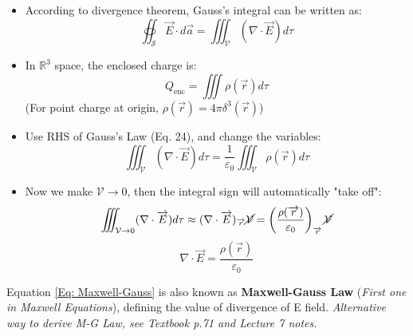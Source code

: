 \documentclass[12pt,a4paper,twoside]{article}
\begin{document}
    \begin{itemize}
        \item According to divergence theorem, Gauss's integral can be written as:
        \[\oiint_\mathcal{S}\overrightarrow{E}\cdot d\overrightarrow{a}=\iiint_{\mathcal{V}}(\nabla\cdot \overrightarrow{E})d\tau\]
        
        \item In $\mathbb{R}^3$ space, the enclosed charge is:
        \[Q_{\mathrm{enc}}=\iiint \rho(\overrightarrow{r})d\tau\]
        (For point charge at origin, $\rho(\overrightarrow{r})=4\pi\delta^3(\overrightarrow{r})$)
        
        \item Use RHS of Gauss's Law (Eq. 24), and change the variables:
        \[\iiint_{\mathcal{V}}(\nabla\cdot \overrightarrow{E})d\tau=\frac{1}{\varepsilon_0}\iiint_{\mathcal{V}}\rho(\overrightarrow{r})d\tau\]
        
        \item Now we make $\mathcal{V}\to 0$, then the integral sign will automatically "take off":
        \[\iiint_{\mathcal{V}\to 0}(\nabla\cdot \overrightarrow{E})d\tau\approx (\nabla\cdot\overrightarrow{E})_{\overrightarrow{r}}\cancel{\mathcal{V}}=\left(\frac{\rho(\overrightarrow{r})}{\varepsilon_0}\right)_{\overrightarrow{r}}\cancel{\mathcal{V}}\]
        \begin{equation}
            \nabla \cdot \overrightarrow{E} = \frac{\rho(\overrightarrow{r})}{\varepsilon_0}
            \label{Eq: Maxwell-Gauss}
        \end{equation}
    \end{itemize}
    Equation \ref{Eq: Maxwell-Gauss} is also known as \textbf{Maxwell-Gauss Law} (\textit{First one in Maxwell Equations}), defining the value of divergence of E field. \textit{Alternative way to derive M-G Law, see Textbook p.71 and Lecture 7 notes.}
\end{document}

